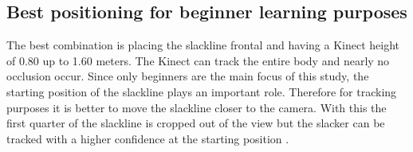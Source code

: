 \subsection{Best positioning for beginner learning purposes}
The best combination is placing the slackline frontal and having a Kinect height of 0.80 up to 1.60 meters. The Kinect can track the entire body and nearly no occlusion occur. Since only beginners are the main focus of this study, the starting position of the slackline plays an important role. Therefore for tracking purposes it is better to move the slackline closer to the camera. With this the first quarter of the slackline is cropped out of the view but the slacker can be tracked with a higher confidence at the starting position \textbf{}.

